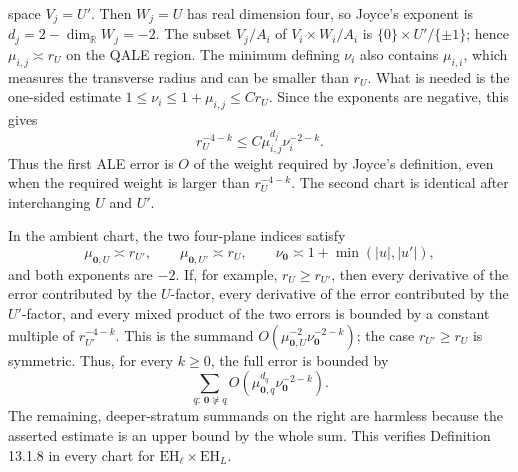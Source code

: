 \documentclass[11pt]{article}
\theoremstyle{remark}\newtheorem{remark}[theorem]{Remark}
\newcommand{\EH}{\mathrm{EH}}
\newcommand{\R}{\mathbb R}
\begin{document}
space $V_j=U'$.  Then $W_j=U$ has real dimension four, so Joyce's exponent
is $d_j=2-\dim_{\R}W_j=-2$.  The subset $V_j/A_i$ of
$V_i\times W_i/A_i$ is $\{0\}\times U'/\{\pm1\}$; hence
$\mu_{i,j}\asymp r_U$ on the QALE region.  The minimum defining $\nu_i$
also contains $\mu_{i,i}$, which measures the transverse radius and can
be smaller than $r_U$.  What is needed is the one-sided estimate
$1\leq\nu_i\leq1+\mu_{i,j}\leq C r_U$.  Since the exponents are negative,
this gives
\[
 r_U^{-4-k}\leq C
 \mu_{i,j}^{d_j}\nu_i^{-2-k}.
\]
Thus the first ALE error is $O$ of the weight required by Joyce's
definition, even when the required weight is larger than
$r_U^{-4-k}$.  The second chart is identical after interchanging $U$ and
$U'$.

In the ambient chart, the two four-plane indices satisfy
\[
 \mu_{\mathbf0,U}\asymp r_{U'},\qquad
 \mu_{\mathbf0,U'}\asymp r_U,\qquad
 \nu_{\mathbf0}\asymp1+\min(|u|,|u'|),
\]
and both exponents are $-2$.  If, for example, $r_U\geq r_{U'}$, then
every derivative of the error contributed by the $U$-factor, every
derivative of the error contributed by the $U'$-factor, and every mixed
product of the two errors is bounded by a constant multiple of
$r_{U'}^{-4-k}$.  This is the summand
$O(\mu_{\mathbf0,U}^{-2}\nu_{\mathbf0}^{-2-k})$; the case
$r_{U'}\geq r_U$ is symmetric.  Thus, for every $k\geq0$, the full error
is bounded by
\[
 \sum_{q:\,\mathbf0\not\succeq q}
 O\!\left(\mu_{\mathbf0,q}^{d_q}
              \nu_{\mathbf0}^{-2-k}\right).
\]
The remaining, deeper-stratum summands on the right are harmless because
the asserted estimate is an upper bound by the whole sum.  This verifies
Definition 13.1.8 in every chart for
$\EH_\ell\times\EH_L$.
\end{document}
